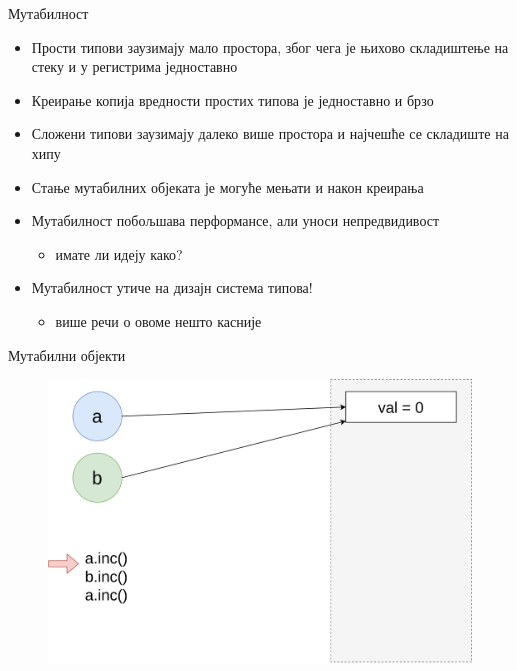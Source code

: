 \documentclass[xcolor=table]{beamer}
\begin{document}
    \begin{frame}{Мутабилност}
        \begin{itemize}
            \item Прости типови заузимају мало простора, због чега је њихово складиштење на стеку и у регистрима једноставно
            \item Креирање копија вредности простих типова је једноставно и брзо
            \item Сложени типови заузимају далеко више простора и најчешће се складиште на хипу
            \item Стање мутабилних објеката је могуће мењати и након креирања
            \item Мутабилност побољшава перформансе, али уноси непредвидивост
            \begin{itemize}
                \item имате ли идеју како?
            \end{itemize}
            \item Мутабилност утиче на дизајн система типова!
            \begin{itemize}
                \item више речи о овоме нешто касније
            \end{itemize}
        \end{itemize}
    \end{frame}
    
    \begin{frame}{Мутабилни објекти}
        \begin{figure}
            \centering
            \includegraphics[height=0.7\textheight,keepaspectratio]{images/mut0.png}
        \end{figure}
    \end{frame}
    
\end{document}
